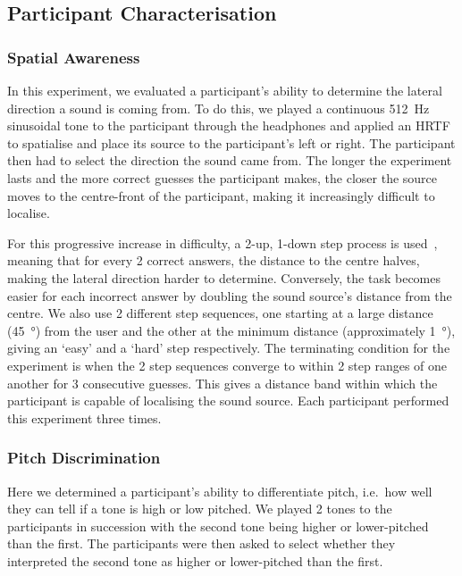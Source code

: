 \documentclass[sigconf, review=true, screen=true, anonymous=true]{acmart}
\begin{document}
\subsection{Participant Characterisation}

\subsubsection{Spatial Awareness}

In this experiment, we evaluated a participant's ability to determine the lateral direction a sound is coming from.
To do this, we played a continuous \SI{512}{\hertz} sinusoidal tone to the participant through the headphones and applied an HRTF to spatialise and place its source to the participant's left or right.
The participant then had to select the direction the sound came from.
The longer the experiment lasts and the more correct guesses the participant makes, the closer the source moves to the centre-front of the participant, making it increasingly difficult to localise. 

For this progressive increase in difficulty, a 2-up, 1-down step process is used~\cite{wetherill1965sequential,levitt1971transformed}, meaning that for every 2 correct answers, the distance to the centre halves, making the lateral direction harder to determine.
Conversely, the task becomes easier for each incorrect answer by doubling the sound source's distance from the centre.
We also use 2 different step sequences, one starting at a large distance (\SI{45}{\degree}) from the user and the other at the minimum distance (approximately \SI{1}{\degree}), giving an `easy' and a `hard' step respectively.
The terminating condition for the experiment is when the 2 step sequences converge to within 2 step ranges of one another for 3 consecutive guesses.
This gives a distance band within which the participant is capable of localising the sound source. Each participant performed this experiment three times. 

\subsubsection{Pitch Discrimination}

Here we determined a participant's ability to differentiate pitch, i.e.\ how well they can tell if a tone is high or low pitched.
We played 2 tones to the participants in succession with the second tone being higher or lower-pitched than the first.
The participants were then asked to select whether they interpreted the second tone as higher or lower-pitched than the first.
\end{document}

